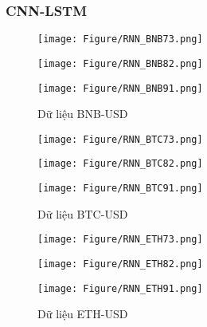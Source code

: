 \documentclass[conference]{IEEEtran}
\begin{document}
\subsubsection{CNN-LSTM}
\begin{figure}[H]
    \centering
    \begin{minipage}{0.15\textwidth}
    \centering
    \texttt{[image: Figure/RNN\_BNB73.png]}
    \end{minipage}
    \hfill
    \begin{minipage}{0.15\textwidth}
    \centering
    \texttt{[image: Figure/RNN\_BNB82.png]}
    \end{minipage}
    \hfill
    \begin{minipage}{0.15\textwidth}
    \centering
    \texttt{[image: Figure/RNN\_BNB91.png]}
    \end{minipage}
    \caption{Dữ liệu BNB-USD}
    \label{fig:1}
\end{figure}

\begin{figure}[H]
    \centering
    \begin{minipage}{0.15\textwidth}
    \centering
    \texttt{[image: Figure/RNN\_BTC73.png]}
    \end{minipage}
    \hfill
    \begin{minipage}{0.15\textwidth}
    \centering
    \texttt{[image: Figure/RNN\_BTC82.png]}
    \end{minipage}
    \hfill
    \begin{minipage}{0.15\textwidth}
    \centering
    \texttt{[image: Figure/RNN\_BTC91.png]}
    \end{minipage}
    \caption{Dữ liệu BTC-USD}
    \label{fig:1}
\end{figure}

\begin{figure}[H]
    \centering
    \begin{minipage}{0.15\textwidth}
    \centering
    \texttt{[image: Figure/RNN\_ETH73.png]}
    \end{minipage}
    \hfill
    \begin{minipage}{0.15\textwidth}
    \centering
    \texttt{[image: Figure/RNN\_ETH82.png]}
    \end{minipage}
    \hfill
    \begin{minipage}{0.15\textwidth}
    \centering
    \texttt{[image: Figure/RNN\_ETH91.png]}
    \end{minipage}
    \caption{Dữ liệu ETH-USD}
    \label{fig:1}
\end{figure}
\end{document}
